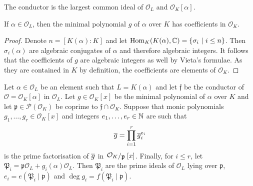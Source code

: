 \begin{opomba}
The conductor is the largest common ideal of $\mathcal{O}_L$ and
$\mathcal{O}_K[\alpha]$.
\end{opomba}

\begin{lema}
If $\alpha \in \mathcal{O}_L$, then the minimal polynomial $g$ of
$\alpha$ over $K$ has coefficients in $\mathcal{O}_K$.
\end{lema}

\begin{proof}
Denote $n = [K(\alpha) : K]$ and let
$\operatorname{Hom}_K(K(\alpha), \mathbb{C}) = \left\{\sigma_i~\middle\vert~i \leq n\right\}$. Then
$\sigma_i(\alpha)$ are algebraic conjugates of $\alpha$ and
therefore algebraic integers. It follows that the coefficients of
$g$ are algebraic integers as well by Vieta's formulae. As they are
contained in $K$ by definition, the coefficients are elements of
$\mathcal{O}_K$.
\end{proof}

\begin{izrek}
\label{decomp:thm:dedekum}
Let $\alpha \in \mathcal{O}_L$ be an element such that
$L = K(\alpha)$ and let $\mathfrak{f}$ be the conductor of
$\mathcal{O} = \mathcal{O}_K[\alpha]$ in $\mathcal{O}_L$. Let
$g \in \mathcal{O}_K[x]$ be the minimal polynomial of $\alpha$ over
$K$ and let $\mathfrak{p} \in \mathcal{P}(\mathcal{O}_K)$ be
coprime to $\mathfrak{f} \cap \mathcal{O}_K$. Suppose that
monic polynomials $g_1, \dots, g_r \in \mathcal{O}_K[x]$ and
integers $e_1, \dots, e_r \in \mathbb{N}$ are such that
\[
\overline{g} = \prod_{i=1}^r \overline{g}_i^{e_i}
\]
is the prime factorisation of $\overline{g}$ in
$\kvoc{\mathcal{O}_K}{\mathfrak{p}}[x]$. Finally, for
$i \leq r$, let
$\mathfrak{P}_i =
\mathfrak{p} \mathcal{O}_L + g_i(\alpha) \mathcal{O}_L$. Then
$\mathfrak{P}_i$ are the prime ideals of $\mathcal{O}_L$ lying over
$\mathfrak{p}$, $e_i = e(\mathfrak{P}_i \mid \mathfrak{p})$ and
$\deg g_i = f(\mathfrak{P}_i \mid \mathfrak{p})$.
\end{izrek}

